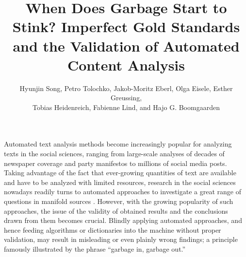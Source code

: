 \documentclass[man, 12pt, a4paper, nolmodern, noextraspace]{apa6}
\title{When Does Garbage Start to Stink? Imperfect Gold Standards and the Validation of Automated Content Analysis}
\author{\addvspace{.25in} Hyunjin Song, Petro Tolochko, Jakob-Moritz Eberl, Olga Eisele, Esther Greussing, \\
        Tobias Heidenreich, Fabienne Lind, and Hajo G. Boomgaarden}
\affiliation{Department of Communication, University of Vienna, Austria}
\begin{document}
    
\setcounter{page}{0}
\maketitle

    Automated text analysis methods become increasingly popular for analyzing texts in the social sciences, ranging from large-scale analyses of decades of newspaper coverage and party manifestos to millions of social media posts. Taking advantage of the fact that ever-growing quantities of text are available and have to be analyzed with limited resources, research in the social sciences nowadays readily turns to automated approaches to investigate a great range of questions in manifold sources \parencite{Boumans_Trilling_2016, grimmer2013text}. However, with the growing popularity of such approaches, the issue of the validity of obtained results and the conclusions drawn from them becomes crucial. Blindly applying automated approaches, and hence feeding algorithms or dictionaries into the machine without proper validation, may result in misleading or even plainly wrong findings; a principle famously illustrated by the phrase \enquote{garbage in, garbage out.}
    
\end{document}
